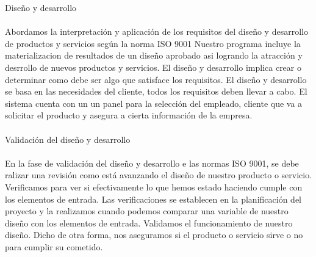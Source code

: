 \documentclass[12pt,a4paper]{article}
\begin{document}
Diseño y desarrollo\\\\
Abordamos la interpretación y aplicación de los requisitos del diseño y desarrollo de productos y servicios según la norma ISO 9001  
Nuestro programa incluye la materializacion de resultados de un diseño aprobado asi logrando la atracción y desrrollo de nuevos productos y servicios. El diseño y desarrollo implica crear o determinar como debe ser algo que satisface los requisitos. El diseño y desarrollo se basa en las necesidades del cliente, todos los requisitos deben llevar a cabo. El sistema cuenta con un un panel para la selección del empleado, cliente que va a solicitar el producto y asegura a cierta información de la empresa.\\\\
Validación del diseño y desarrollo\\\\
En la fase de validación del diseño y desarrollo e las normas ISO 9001, se  debe ralizar una revisión como está avanzando el diseño de nuestro producto o servicio. Verificamos para ver si efectivamente lo que hemos estado haciendo cumple con los elementos de entrada. Las verificaciones se establecen en la planificación del proyecto y la realizamos cuando podemos comparar una variable de nuestro diseño con los elementos de entrada. Validamos el funcionamiento de nuestro diseño. Dicho de otra forma, nos aseguramos si el producto o servicio sirve o no para cumplir su cometido.
\end{document}
